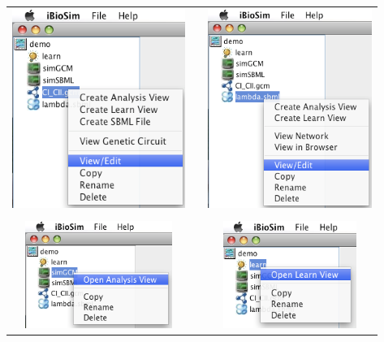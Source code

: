 \documentclass[titlepage,11pt]{article}
\begin{document}
\begin{center}
\begin{tabular}{ccc}
\includegraphics[height=65mm]{screenshots/modGCM} & &
\includegraphics[height=65mm]{screenshots/modSBML} \\ \\
\includegraphics[height=35mm]{screenshots/modAnalysis} & &
\includegraphics[height=35mm]{screenshots/modLearn}
\end{tabular}
\end{center}

\clearpage
\end{document}
